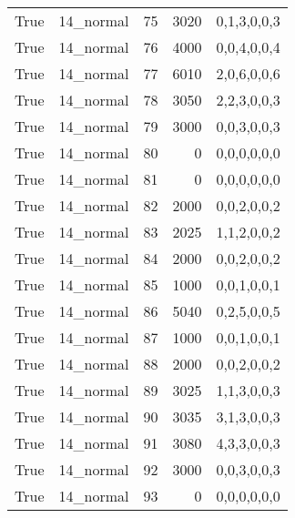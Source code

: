 \begin{tabular}{llrrl}
 True            & 14\_normal           &            75 &                  3020 & 0,1,3,0,0,3   \\
 True            & 14\_normal           &            76 &                  4000 & 0,0,4,0,0,4   \\
 True            & 14\_normal           &            77 &                  6010 & 2,0,6,0,0,6   \\
 True            & 14\_normal           &            78 &                  3050 & 2,2,3,0,0,3   \\
 True            & 14\_normal           &            79 &                  3000 & 0,0,3,0,0,3   \\
 True            & 14\_normal           &            80 &                     0 & 0,0,0,0,0,0   \\
 True            & 14\_normal           &            81 &                     0 & 0,0,0,0,0,0   \\
 True            & 14\_normal           &            82 &                  2000 & 0,0,2,0,0,2   \\
 True            & 14\_normal           &            83 &                  2025 & 1,1,2,0,0,2   \\
 True            & 14\_normal           &            84 &                  2000 & 0,0,2,0,0,2   \\
 True            & 14\_normal           &            85 &                  1000 & 0,0,1,0,0,1   \\
 True            & 14\_normal           &            86 &                  5040 & 0,2,5,0,0,5   \\
 True            & 14\_normal           &            87 &                  1000 & 0,0,1,0,0,1   \\
 True            & 14\_normal           &            88 &                  2000 & 0,0,2,0,0,2   \\
 True            & 14\_normal           &            89 &                  3025 & 1,1,3,0,0,3   \\
 True            & 14\_normal           &            90 &                  3035 & 3,1,3,0,0,3   \\
 True            & 14\_normal           &            91 &                  3080 & 4,3,3,0,0,3   \\
 True            & 14\_normal           &            92 &                  3000 & 0,0,3,0,0,3   \\
 True            & 14\_normal           &            93 &                     0 & 0,0,0,0,0,0   \\

\end{tabular}
